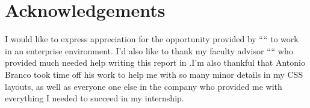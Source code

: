 


% 
% 
% 

\begingroup
\let\clearpage\relax
\let\cleardoublepage\relax
\let\cleardoublepage\relax
\chapter*{Acknowledgements}

I would like to express appreciation for the opportunity provided by ``\company`` to work
in an enterprise environment. I'd also like to thank my faculty advisor ``\myProf`` 
who provided much needed help writing this report in \LaTeXe.I'm also thankful that 
Antonio Branco took time off his work to help me with so many minor details in my CSS
layouts, as well as everyone one else in the company who provided me with everything I
needed to succeed in my internship.\\



\endgroup



